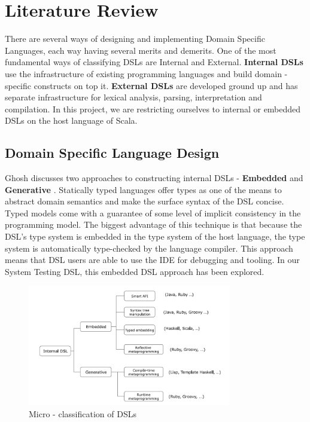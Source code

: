 \documentclass[12 pt]{article}
\begin{document}
\newpage
\section{Literature Review}
There are several ways of designing and implementing Domain Specific Languages, each way having several merits and demerits. One of the most fundamental ways of classifying DSLs are Internal and External. \textbf{Internal DSLs} use the infrastructure of existing programming languages and build domain - specific constructs on top it. \textbf{External DSLs} are developed ground up and has separate infrastructure for lexical analysis, parsing, interpretation and compilation. In this project, we are restricting ourselves to internal or embedded DSLs on the host language of Scala.
\bigskip

\subsection{Domain Specific Language Design}
Ghosh discusses two approaches to constructing internal DSLs - \textbf{Embedded} and \textbf{Generative} \cite{dslsInAction}. Statically typed languages offer types as one of the means to abstract domain semantics and make the surface syntax of the DSL concise. Typed models come with a
guarantee of some level of implicit consistency in the programming model. The biggest advantage of this technique is that because the DSL’s type system is embedded in the type system of the host language, the type system is automatically type-checked by the language compiler. This approach means that DSL users are able to use the IDE for debugging and tooling. In our System Testing DSL, this embedded DSL approach has been explored.
\bigskip

\begin{figure}[h!]
  \centering
    \includegraphics[height=200px]{figures/classification.png}
  \caption{Micro - classification of DSLs}
\end{figure}
\end{document}

